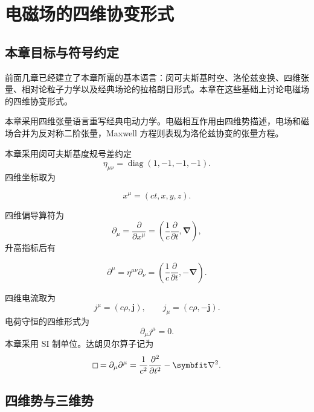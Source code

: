 \chapter{电磁场的四维协变形式}

\section{本章目标与符号约定}

前面几章已经建立了本章所需的基本语言：闵可夫斯基时空、洛伦兹变换、四维张量、相对论粒子力学以及经典场论的拉格朗日形式。本章在这些基础上讨论电磁场的四维协变形式。

本章采用四维张量语言重写经典电动力学。电磁相互作用由四维势描述，电场和磁场合并为反对称二阶张量，Maxwell 方程则表现为洛伦兹协变的张量方程。

本章采用闵可夫斯基度规号差约定
\begin{equation}
	\eta_{\mu\nu}=\operatorname{diag}(1,-1,-1,-1).
	\label{eq:8.1}
\end{equation}
四维坐标取为

\[
x^{\mu}=(ct,x,y,z).
\]

四维偏导算符为
\begin{equation}
	\partial_{\mu}
	=
	\frac{\partial}{\partial x^{\mu}}
	=
	\left(
	\frac{1}{c}\frac{\partial}{\partial t},
	\bm{\nabla}
	\right),
	\label{eq:8.3}
\end{equation}
升高指标后有

\[
\partial^{\mu}
=
\eta^{\mu\nu}\partial_{\nu}
=
\left(
\frac{1}{c}\frac{\partial}{\partial t},
-\bm{\nabla}
\right).
\]

四维电流取为
\begin{equation}
	j^{\mu}=(c\rho,\bm{j}),
	\qquad
	j_{\mu}=(c\rho,-\bm{j}).
	\label{eq:8.5}
\end{equation}
电荷守恒的四维形式为
\begin{equation}
	\partial_{\mu}j^{\mu}=0.
	\label{eq:8.6}
\end{equation}
本章采用 SI 制单位。达朗贝尔算子记为
\begin{equation}
	\dalembert
	=
	\partial_{\mu}\partial^{\mu}
	=
	\frac{1}{c^{2}}\frac{\partial^{2}}{\partial t^{2}}
	-
	\bm{\nabla}^{2}.
	\label{eq:8.7}
\end{equation}

\section{四维势与三维势}

